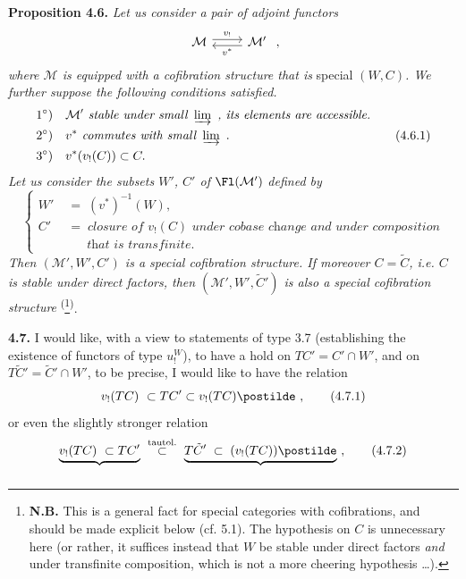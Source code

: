 \textbf{Proposition 4.6.} \textit{Let us consider a pair of adjoint functors}
\[
\begin{tikzcd}
\mathcal{M} \arrow[r, shift left, "v_!"] & \mathcal{M}' \arrow[l, shift left, "v^*"]
\end{tikzcd}
\ ,
\]
\textit{where $\mathcal{M}$ is equipped with a cofibration structure that is} special $(W, C)$\textit{. We further suppose the following conditions satisfied.}
\[
\begin{aligned}
&1^\circ)\quad \mathcal{M}' \textit{ stable under small } \varinjlim\ \textit{, its elements are accessible.} \\
&2^\circ)\quad v^* \textit{ commutes with small } \varinjlim\ . \\
&3^\circ)\quad v^*(v_!(C)) \subset C.
\end{aligned} \tag*{(4.6.1)}
\]
\textit{Let us consider the subsets $W'$, $C'$ of} $\Fl(\mathcal{M}')$ \textit{defined by}
\[
\left\{
\begin{aligned}
W' \;&=\; (v^*)^{-1}(W), \\
C' \;&=\; \textit{closure of } v_!(C) \textit{ under cobase change and under composition} \\
&\phantom{\;=\;}\ \textit{that is transfinite.}
\end{aligned}
\right. \tag*{(4.6.2)}
\]
\textit{Then $(\mathcal{M}', W', C')$ is a special cofibration structure. If moreover $C = \tilde{C}$, i.e. $C$ is stable under direct factors, then $(\mathcal{M}', W', \tilde{C}')$ is also a special cofibration structure} \textsuperscript{(}\footnote[20]{\textbf{N.B.} This is a general fact for special categories with cofibrations, and should be made explicit below (cf. 5.1). The hypothesis on $C$ is unnecessary here (or rather, it suffices instead that $W$ be stable under direct factors \textit{and} under transfinite composition, which is not a more cheering hypothesis \dots).}\textsuperscript{)}.

\textbf{4.7.} I would like, with a view to statements of type 3.7 (establishing the existence of functors of type $u_!^W$), to have a hold on $TC' = C'{\cap}W'$, and on $T\tilde{C}' = \tilde{C}'{\cap}W'$, to be precise, I would like to have the relation
\[
v_!(TC)\ \subset TC' \subset v_!(TC)\postilde\ , \tag*{(4.7.1)}
\]
or even the slightly stronger relation
\[
\underbrace{v_!(TC)\ \subset TC'}_{} \ \overset{\text{tautol.}}{\subset}\ \underbrace{T\tilde{C}' \;\subset\; (v_!(TC))\postilde}_{}\ , \tag*{(4.7.2)}
\]